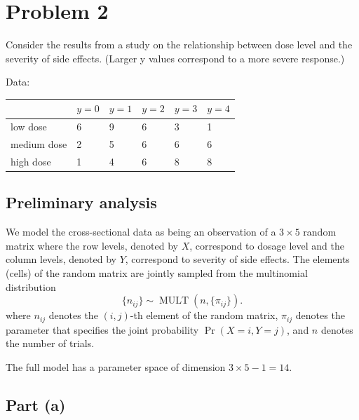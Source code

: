 \documentclass[
]{article}
\begin{document}
\hypertarget{problem-2}{%
\section{Problem 2}\label{problem-2}}

Consider the results from a study on the relationship between dose level
and the severity of side effects. (Larger y values correspond to a more
severe response.)

Data:

\begin{longtable}[]{@{}llllll@{}}
\toprule\noalign{}
& \(y = 0\) & \(y = 1\) & \(y = 2\) & \(y = 3\) & \(y = 4\) \\
\midrule\noalign{}
\endhead
\bottomrule\noalign{}
\endlastfoot
low dose & 6 & 9 & 6 & 3 & 1 \\
medium dose & 2 & 5 & 6 & 6 & 6 \\
high dose & 1 & 4 & 6 & 8 & 8 \\
\end{longtable}

\hypertarget{preliminary-analysis}{%
\subsection{Preliminary analysis}\label{preliminary-analysis}}

We model the cross-sectional data as being an observation of a
\(3 \times 5\) random matrix where the row levels, denoted by \(X\),
correspond to dosage level and the column levels, denoted by \(Y\),
correspond to severity of side effects. The elements (cells) of the
random matrix are jointly sampled from the multinomial distribution \[
  \{n_{i j}\} \sim \operatorname{MULT}(n, \{\pi_{i j}\}).
\] where \(n_{i j}\) denotes the \((i,j)\)-th element of the random
matrix, \(\pi_{i j}\) denotes the parameter that specifies the joint
probability \(\Pr(X=i,Y=j)\), and \(n\) denotes the number of trials.

The full model has a parameter space of dimension
\(3 \times 5 - 1 = 14\).

\hypertarget{part-a-1}{%
\subsection{Part (a)}\label{part-a-1}}

\end{document}
